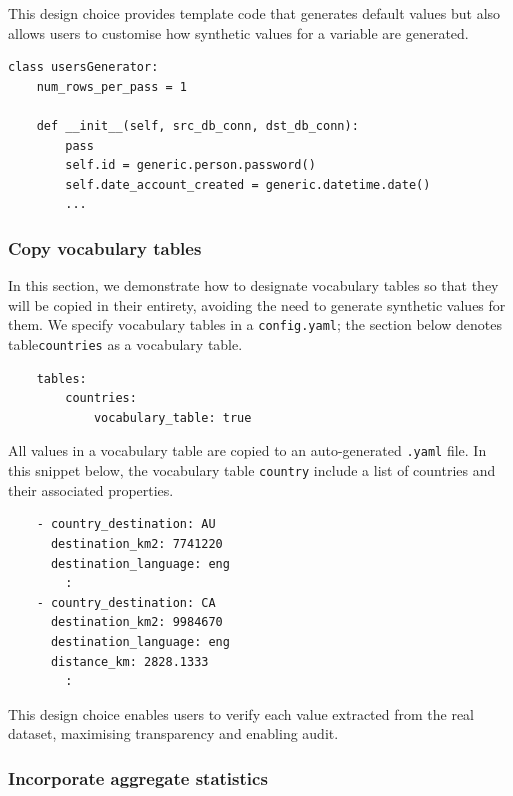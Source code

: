 \documentclass[11pt]{article}
\begin{document}
This design choice provides template code that generates default values but also allows users to customise how synthetic values for a variable are generated.

\begin{verbatim}
class usersGenerator:
    num_rows_per_pass = 1

    def __init__(self, src_db_conn, dst_db_conn):
        pass
        self.id = generic.person.password()
        self.date_account_created = generic.datetime.date()
        ...
\end{verbatim}

\subsubsection{Copy vocabulary tables}

In this section, we demonstrate how to designate vocabulary tables so that they will be copied in their entirety, avoiding the need to generate synthetic values for them. We specify vocabulary tables in a \texttt{config.yaml}; the section below denotes table\texttt{countries} as a vocabulary table.

\begin{verbatim}
    tables:
        countries:
            vocabulary_table: true
\end{verbatim}

All values in a vocabulary table are copied to an auto-generated \texttt{.yaml} file. In this snippet below, the vocabulary table \texttt{country} include a list of countries and their associated properties. 

\begin{verbatim}
    - country_destination: AU
      destination_km2: 7741220
      destination_language: eng
        :
    - country_destination: CA
      destination_km2: 9984670
      destination_language: eng
      distance_km: 2828.1333
        :
\end{verbatim}

This design choice enables users to verify each value extracted from the real dataset, maximising transparency and enabling audit.

\subsubsection{Incorporate aggregate statistics}
\end{document}
